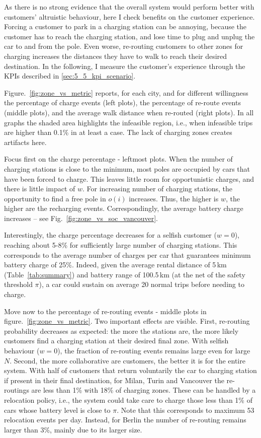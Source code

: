 As there is no strong evidence that the overall system would perform better with customers' altruistic behaviour, here I check benefits on the customer experience. Forcing a customer to park in a charging station can be annoying, because the customer has to reach the charging station, and lose time to plug and unplug the car to and from the pole. Even worse, re-routing customers to other zones for charging increases the distances they have to walk to reach their desired destination.
In the following, I measure the customer's experience through the KPIs described in \ref{sec:5_5_kpi_scenario}.

Figure.~\ref{fig:zone_vs_metric} reports, for each city, and for different willingness the percentage of charge events (left plots), the percentage of re-route events (middle plots), and the average walk distance when re-routed (right plots). In all graphs the shaded area highlights the infeasible region, i.e., when infeasible trips are higher than 0.1\% in at least a case. The lack of charging zones creates artifacts here. 

Focus first on the charge percentage - leftmost plots. When the number of charging stations is close to the minimum, most poles are occupied by cars that have been forced to charge. This leaves little room for opportunistic charges, and there is little impact of $w$. For increasing number of charging stations, the opportunity to find a free pole in $o(i)$ increases. Thus, the higher is $w$, the higher are the recharging events. Correspondingly, the average battery charge increases -- see Fig.~\ref{fig:zone_vs_soc_vancouver}.

Interestingly, the charge percentage decreases for a selfish customer ($w=0$), reaching about 5-8\% for sufficiently large number of charging stations. This corresponds to the average number of charges per car that guarantees minimum battery charge of 25\%. Indeed, given the average rental distance of 5\,km (Table~\ref{tab:summary}) and battery range of 100.5\,km (at the net of the safety threshold $\pi$), a car could sustain on average 20 normal trips before needing to charge.  

Move now to the percentage of re-routing events - middle plots in figure.~\ref{fig:zone_vs_metric}. Two important effects are visible. First, re-routing probability decreases as expected: the more the stations are, the more likely customers find a charging station at their desired final zone. With selfish behaviour ($w=0$), the fraction of re-routing events remains large even for large $N$.
Second, the more collaborative are customers, the better it is for the entire system. With half of customers that return voluntarily the car to charging station if present in their final destination, for Milan, Turin and Vancouver the re-routings are less than 1\% with 18\% of charging zones. These can be handled by a relocation policy, i.e., the system could take care to charge those less than 1\% of cars whose battery level is close to $\pi$. Note that this corresponds to maximum 53 relocation events per day. Instead, for Berlin the number of re-routing remains larger than 3\%, mainly due to its larger size.



